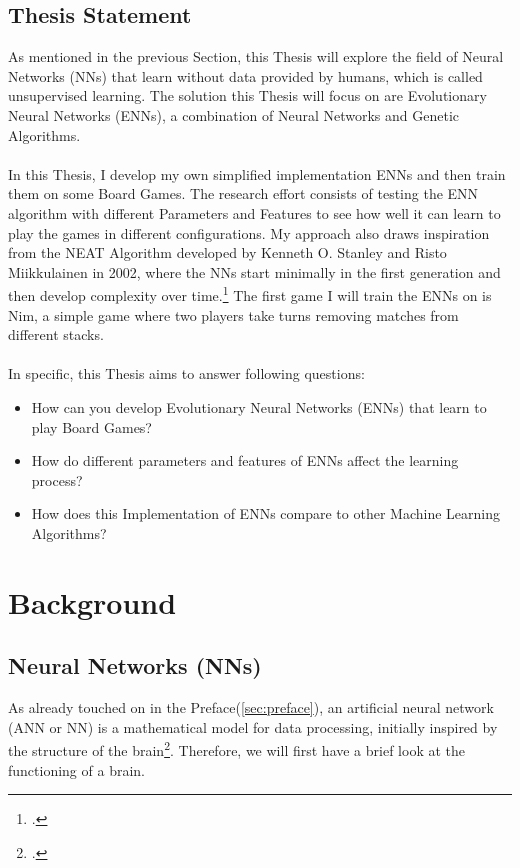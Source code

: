 \documentclass[11pt]{report}
\begin{document}
        \section{Thesis Statement}\label{sec:thesis-statement}
    As mentioned in the previous Section, this Thesis will explore the field of Neural Networks (NNs) that learn without data provided by humans, which is called unsupervised learning.
    The solution this Thesis will focus on are Evolutionary Neural Networks (ENNs), a combination of Neural Networks and Genetic Algorithms.
    \\ \\
    In this Thesis, I develop my own simplified implementation ENNs and then train them on some Board Games.
    The research effort consists of testing the ENN algorithm with different Parameters and Features to see how well it can learn to play the games in different configurations.
    My approach also draws inspiration from the NEAT Algorithm developed by Kenneth O. Stanley and Risto Miikkulainen in 2002, where the NNs start minimally in the first generation and then develop complexity over time.\footcite[p.105-106]{Neat_02}
    The first game I will train the ENNs on is Nim, a simple game where two players take turns removing matches from different stacks.
    \\ \\
    In specific, this Thesis aims to answer following questions:
    \begin{itemize}
        \item How can you develop Evolutionary Neural Networks (ENNs) that learn to play Board Games?
        \item How do different parameters and features of ENNs affect the learning process?
        \item How does this Implementation of ENNs compare to other Machine Learning Algorithms?
    \end{itemize}
    \chapter{Background}\label{ch:background}
    \section{Neural Networks (NNs)}\label{sec:neural-networks-(nns)}
    As already touched on in the Preface(\ref{sec:preface}), an artificial neural network (ANN or NN) is a mathematical model for data processing, initially inspired by the structure of the brain\footcite{Chandra_22}.
    Therefore, we will first have a brief look at the functioning of a brain.
\end{document}
